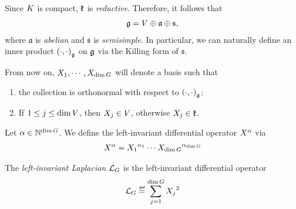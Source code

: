 Since $\CompactGroup$ is compact,
$\LieAlgebraCompactGroup$ is \emph{reductive}.
Therefore, it follows that
\begin{align*}
    \LieAlgebra = \VectorSpace \oplus \mathfrak a \oplus \mathfrak s,
\end{align*}
where $\mathfrak a$ is \emph{abelian} and $\mathfrak s$ is \emph{semisimple}.
In particular, we can naturally define an inner product $\ip[\LieAlgebra]\dummy\dummy$ on $\LieAlgebra$ via the Killing form of $\mathfrak s$.

From now on,
$X_1, \cdots, X_{\dim \Group}$ will denote a basis such that
\begin{enumerate}
    \item the collection is orthonormal with respect to $\ip[\LieAlgebra]\dummy\dummy$;
    \item If $1 \leq j \leq \dim \VectorSpace$, then $X_j \in \VectorSpace$,
        otherwise $X_j \in \LieAlgebraCompactGroup$.
\end{enumerate}

\begin{definition}
    Let $\alpha \in \N^{\dim \Group}$.
    We define the left-invariant differential operator $\LeftDifferentialOperator{\alpha}$ via
    \begin{align*}
        \LeftDifferentialOperator{\alpha} =
        \LeftDifferentialOperatorFirstOrder{X_1}^{\alpha_1} \cdots
        \LeftDifferentialOperatorFirstOrder{X_{\dim \Group}}^{\alpha_{\dim \Group}}
    \end{align*}
\end{definition}

\begin{definition}
\label{definition:left-invariant_Laplacian}
    The \emph{left-invariant Laplacian} $\Laplacian$ is the left-invariant differential operator
    \begin{align*}
        \Laplacian \defeq \sum_{j = 1}^{\dim \Group} \LeftDifferentialOperatorFirstOrder{X_j}^2
    \end{align*}
\end{definition}

